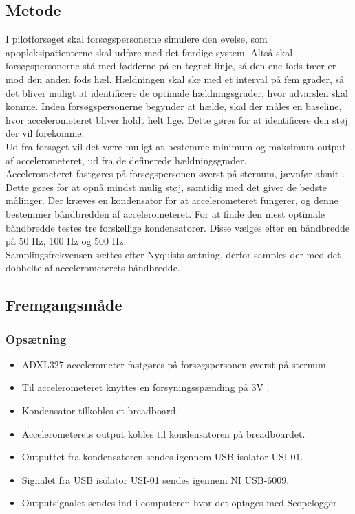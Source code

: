 \subsection{Metode}
I pilotforsøget skal forsøgspersonerne simulere den øvelse, som apopleksipatienterne skal udføre med det færdige system. Altså skal forsøgspersonerne stå med fødderne på en tegnet linje, så den ene fods tæer er mod den anden fods hæl. Hældningen skal ske med et interval på fem grader, så det bliver muligt at identificere de optimale hældningsgrader, hvor advarslen skal komme. Inden forsøgspersonerne begynder at hælde, skal der måles en baseline, hvor accelerometeret bliver holdt helt lige. Dette gøres for at identificere den støj der vil forekomme. \\
Ud fra forsøget vil det være muligt at bestemme minimum og maksimum output af accelerometeret, ud fra de definerede hældningsgrader. \\
Accelerometeret fastgøres på forsøgspersonen øverst på sternum, jævnfør afsnit . Dette gøres for at opnå mindst mulig støj, samtidig med det giver de bedste målinger. Der kræves en kondensator for at accelerometeret fungerer, og denne bestemmer båndbredden af accelerometeret. For at finde den mest optimale båndbredde testes tre forskellige kondensatorer. Disse vælges efter en båndbredde på 50 Hz, 100 Hz og 500 Hz. \\
Samplingsfrekvensen sættes efter Nyquists sætning, derfor samples der med det dobbelte af accelerometerets båndbredde.


\subsection{Fremgangsmåde}
\subsubsection{Opsætning}
\begin{itemize}
\item ADXL327 accelerometer fastgøres på forsøgspersonen øverst på sternum.
\item Til accelerometeret knyttes en forsyningsspænding på 3V .
\item Kondensator tilkobles et breadboard.
\item Accelerometerets output kobles til kondensatoren på breadboardet.
\item Outputtet fra kondensatoren sendes igennem USB isolator USI-01.
\item Signalet fra USB isolator USI-01 sendes igennem NI USB-6009.
\item Outputsignalet sendes ind i computeren hvor det optages med Scopelogger.
\end{itemize}

